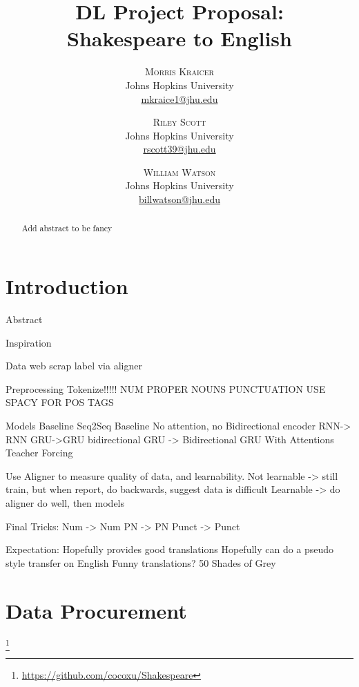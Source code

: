 \documentclass[twoside,twocolumn]{article}
\title{DL Project Proposal:\\Shakespeare to English}
\author{%
\textsc{Morris Kraicer} \\[1ex]
\normalsize Johns Hopkins University \\
\normalsize \href{mailto:mkraice1@jhu.edu}{mkraice1@jhu.edu}
 \and
 \textsc{Riley Scott} \\[1ex]
\normalsize Johns Hopkins University \\
\normalsize \href{mailto:rscott39@jhu.edu}{rscott39@jhu.edu}
 \and
  \textsc{William Watson} \\[1ex]
\normalsize Johns Hopkins University \\
\normalsize \href{mailto:billwatson@jhu.edu}{billwatson@jhu.edu}
}
\date{}%
\begin{document}
\maketitle





\begin{abstract}
\noindent
Add abstract to be fancy
\end{abstract}

\section{Introduction}
Abstract

Inspiration

Data
	web scrap
	label via aligner

Preprocessing
	Tokenize!!!!!
		NUM
		PROPER NOUNS
		PUNCTUATION
		USE SPACY FOR POS TAGS

Models
	Baseline
		Seq2Seq Baseline
			No attention, no Bidirectional
			encoder RNN-> RNN
		GRU->GRU
		bidirectional GRU -> Bidirectional GRU
		With Attentions
		Teacher Forcing

	Use Aligner to measure quality of data, and learnability.
		Not learnable -> still train, but when report, do backwards, suggest data is difficult
		Learnable -> do aligner do well, then models

Final Tricks:
	Num -> Num
	PN -> PN
	Punct -> Punct

Expectation:
	Hopefully provides good translations
	Hopefully can do a pseudo style transfer on English
	Funny translations? 50 Shades of Grey
\section{Data Procurement}
\footnote{\url{https://github.com/cocoxu/Shakespeare}}
\end{document}
